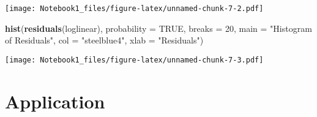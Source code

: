 \documentclass[]{article}
\newenvironment{Shaded}{\begin{snugshade}}{\end{snugshade}}
\newcommand{\DataTypeTok}[1]{\textcolor[rgb]{0.13,0.29,0.53}{#1}}
\newcommand{\DecValTok}[1]{\textcolor[rgb]{0.00,0.00,0.81}{#1}}
\newcommand{\KeywordTok}[1]{\textcolor[rgb]{0.13,0.29,0.53}{\textbf{#1}}}
\newcommand{\NormalTok}[1]{#1}
\newcommand{\OtherTok}[1]{\textcolor[rgb]{0.56,0.35,0.01}{#1}}
\newcommand{\StringTok}[1]{\textcolor[rgb]{0.31,0.60,0.02}{#1}}
\begin{document}
\texttt{[image: Notebook1\_files/figure-latex/unnamed-chunk-7-2.pdf]}

\begin{Shaded}
\begin{Highlighting}[]
\KeywordTok{hist}\NormalTok{(}\KeywordTok{residuals}\NormalTok{(loglinear), }\DataTypeTok{probability =} \OtherTok{TRUE}\NormalTok{, }\DataTypeTok{breaks =} \DecValTok{20}\NormalTok{, }
     \DataTypeTok{main =} \StringTok{"Histogram of Residuals"}\NormalTok{, }
     \DataTypeTok{col  =} \StringTok{"steelblue4"}\NormalTok{, }
     \DataTypeTok{xlab =} \StringTok{"Residuals"}\NormalTok{)}
\end{Highlighting}
\end{Shaded}

\texttt{[image: Notebook1\_files/figure-latex/unnamed-chunk-7-3.pdf]}

\hypertarget{application}{%
\section{Application}\label{application}}
\end{document}
